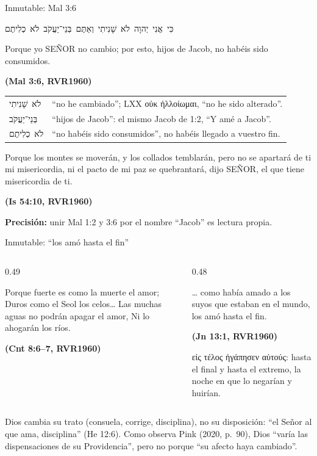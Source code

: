 \documentclass[hyperref={bookmarks=false},aspectratio=169]{beamer}
\newcommand{\heb}[1]{\mbox{\foreignlanguage{hebrew}{#1}}}
\newcommand{\grc}[1]{\foreignlanguage{ancientgreek}{#1}}
\newcommand{\SENOR}{S{\fontsize{0.78em}{1em}\selectfont EÑOR}}
\newcommand{\fuente}[1]{\par\hfill{\upshape\bfseries\footnotesize\textcolor{azul}{#1}}}
\newcommand{\precision}[1]{{\footnotesize\color{gris}\textbf{Precisión:} #1}}
\begin{document}
\begin{frame}{Inmutable: Mal 3:6}
\begin{center}\heb{כִּי אֲנִי יְהוָה לֹא שָׁנִיתִי וְאַתֶּם בְּנֵי־יַעֲקֹב לֹא כְלִיתֶם}\end{center}
\begin{cita}Porque yo \SENOR{} no cambio; por esto, hijos de Jacob, no habéis sido consumidos.\fuente{(Mal 3:6, RVR1960)}\end{cita}
\renewcommand{\arraystretch}{1.08}\scriptsize
\begin{tabular}{@{}>{\RaggedRight\arraybackslash}p{2.6cm}>{\RaggedRight\arraybackslash}p{9.3cm}@{}}
\heb{לֹא שָׁנִיתִי} & ``no he cambiado''; LXX \grc{οὐκ ἠλλοίωμαι}, ``no he sido alterado''. \\
\heb{בְּנֵי־יַעֲקֹב} & ``hijos de Jacob'': el mismo Jacob de 1:2, ``Y amé a Jacob''. \\
\heb{לֹא כְלִיתֶם} & ``no habéis sido consumidos'', no habéis llegado a vuestro fin. \\
\end{tabular}\par\medskip
\begin{cita}Porque los montes se moverán, y los collados temblarán, pero no se apartará de ti mi misericordia, ni el pacto de mi paz se quebrantará, dijo \SENOR, el que tiene misericordia de ti.\fuente{(Is 54:10, RVR1960)}\end{cita}
\precision{unir Mal 1:2 y 3:6 por el nombre ``Jacob'' es lectura propia.}
\end{frame}

\begin{frame}{Inmutable: ``los amó hasta el fin''}
\begin{columns}[t,onlytextwidth]
\begin{column}{0.49\textwidth}
\begin{cita}Porque fuerte es como la muerte el amor; Duros como el Seol los celos\ldots{} Las muchas aguas no podrán apagar el amor, Ni lo ahogarán los ríos.\fuente{(Cnt 8:6--7, RVR1960)}\end{cita}
\end{column}
\begin{column}{0.48\textwidth}
\begin{cita}\ldots{} como había amado a los suyos que estaban en el mundo, los amó hasta el fin.\fuente{(Jn 13:1, RVR1960)}\end{cita}
\scriptsize\grc{εἰς τέλος ἠγάπησεν αὐτούς}: hasta el final y hasta el extremo, la noche en que lo negarían y huirían.
\end{column}
\end{columns}\medskip
\begin{tcolorbox}[colback=dorado!10,colframe=dorado!85!azul,boxrule=0.6pt,arc=2pt]
\small Dios cambia su trato (consuela, corrige, disciplina), no su disposición: ``el Señor al que ama, disciplina'' (He 12:6). Como observa Pink (2020, p.~90), Dios ``varía las dispensaciones de su Providencia'', pero no porque ``su afecto haya cambiado''.
\end{tcolorbox}
\end{frame}
\end{document}
